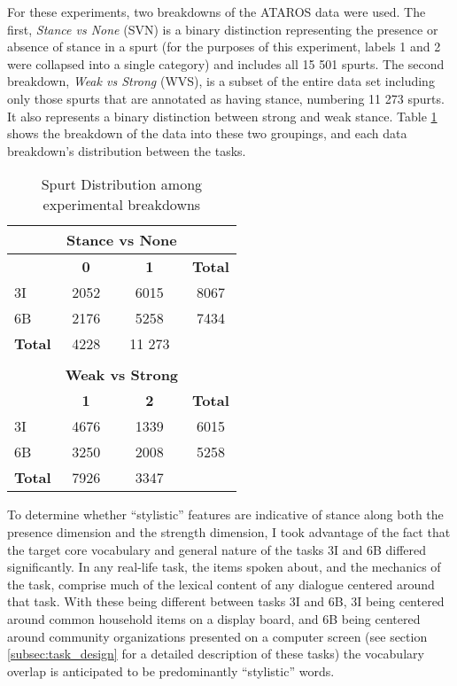For these experiments, two breakdowns of the ATAROS data were used.  The first, \emph{Stance vs None} (SVN) is a binary distinction representing the presence or absence of stance in a spurt (for the purposes of this experiment, labels 1 and 2 were collapsed into a single category) and includes all 15 501 spurts.  The second breakdown, \emph{Weak vs Strong} (WVS), is a subset of the entire data set including only those spurts that are annotated as having stance, numbering 11 273 spurts.  It also represents a binary distinction between strong and weak stance.  Table \ref{tab:spurt_distribution} shows the breakdown of the data into these two groupings, and each data breakdown's distribution between the tasks.  

\begin{table}[h]
\centering
\begin{tabular}{l | c | c | c }
	& \multicolumn{2}{c}{\textbf{Stance vs None}} \\
	\hline
	               &  \textbf{0} &  \textbf{1} & \textbf{Total} \\
	            3I &  2052       &  6015       & 8067           \\
	            6B &  2176       &  5258       & 7434           \\ 
	            \hline
	\textbf{Total} &  4228       &  11 273     & \\ 

	\multicolumn{3}{c}{}    \\ 
	& \multicolumn{2}{c}{\textbf{Weak vs Strong}} \\ 
	\hline
                   & \textbf{1}  &  \textbf{2} & \textbf{Total} \\	
	            3I & 4676        &  1339       & 6015 \\ 
	            6B & 3250        &  2008       & 5258 \\
	            \hline
	\textbf{Total} & 7926        &  3347       & \\
\end{tabular}
\caption{Spurt Distribution among experimental breakdowns}
\label{tab:spurt_distribution}
\end{table}

To determine whether ``stylistic'' features are indicative of stance along both the presence dimension and the strength dimension, I took advantage of the fact that the target core vocabulary and general nature of the tasks 3I and 6B differed significantly.  In any real-life task, the items spoken about, and the mechanics of the task, comprise much of the lexical content of any dialogue centered around that task.  With these being different between tasks 3I and 6B, 3I being centered around common household items on a display board, and 6B being centered around community organizations presented on a computer screen  (see section \ref{subsec:task_design} for a detailed description of these tasks) the vocabulary overlap is anticipated to be predominantly ``stylistic'' words. 

